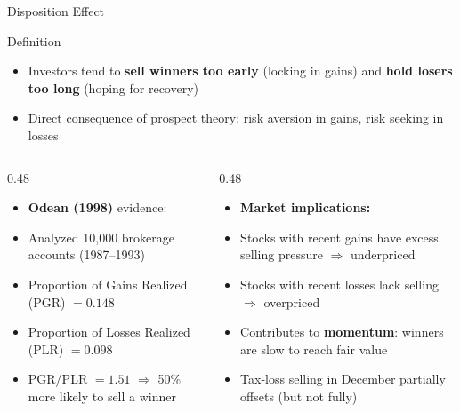\documentclass[9pt, aspectratio=169, t]{beamer}
\theoremstyle{definition}
\newenvironment{cminipage}[1]{%
    \par\noindent\hfill\begin{minipage}{#1}\ignorespaces
}{%
    \end{minipage}\hfill\null\par
}
\begin{document}
\begin{frame}{Disposition Effect}
\begin{cminipage}{0.95\textwidth}
\small
\begin{block}{Definition}
\begin{itemize}\setlength{\itemsep}{0pt}
    \item Investors tend to \textbf{sell winners too early} (locking in gains) and \textbf{hold losers too long} (hoping for recovery)
    \item Direct consequence of prospect theory: risk aversion in gains, risk seeking in losses
\end{itemize}
\end{block}

\begin{columns}[T]
\begin{column}{0.48\textwidth}
\begin{itemize}\setlength{\itemsep}{0pt}
    \item \textbf{Odean (1998)} evidence:
    \item Analyzed 10{,}000 brokerage accounts (1987--1993)
    \item Proportion of Gains Realized (PGR) $= 0.148$
    \item Proportion of Losses Realized (PLR) $= 0.098$
    \item PGR/PLR $= 1.51$ $\Rightarrow$ 50\% more likely to sell a winner
\end{itemize}
\end{column}
\begin{column}{0.48\textwidth}
\begin{itemize}\setlength{\itemsep}{0pt}
    \item \textbf{Market implications:}
    \item Stocks with recent gains have excess selling pressure $\Rightarrow$ underpriced
    \item Stocks with recent losses lack selling $\Rightarrow$ overpriced
    \item Contributes to \textbf{momentum}: winners are slow to reach fair value
    \item Tax-loss selling in December partially offsets (but not fully)
\end{itemize}
\end{column}
\end{columns}
\end{cminipage}
\end{frame}
\end{document}
